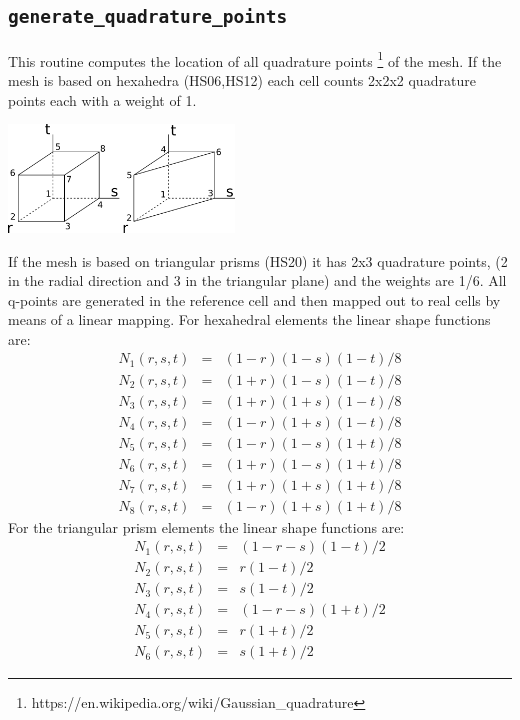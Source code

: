  \subsection{\tt generate\_quadrature\_points}
 This routine computes the location of all quadrature points
 \footnote{https://en.wikipedia.org/wiki/Gaussian\_quadrature} of the mesh. 
 If the mesh is based on hexahedra (HS06,HS12) each cell counts 2x2x2 quadrature points
 each with a weight of 1.
 \begin{center}
 \includegraphics[width=6cm]{images/elements}
 \end{center}
 If the mesh is based on triangular prisms (HS20) it has 2x3 quadrature points, 
 (2 in the radial direction and 3 in the triangular plane) and the weights are 1/6.
 All q-points are generated in the reference cell and then mapped out to real 
 cells by means of a linear mapping.
 For hexahedral elements the linear shape functions are:
 \begin{eqnarray}
 N_1(r,s,t) &=& (1-r)(1-s)(1-t)/8 \nonumber\\ 
 N_2(r,s,t) &=& (1+r)(1-s)(1-t)/8 \nonumber\\ 
 N_3(r,s,t) &=& (1+r)(1+s)(1-t)/8 \nonumber\\ 
 N_4(r,s,t) &=& (1-r)(1+s)(1-t)/8 \nonumber\\ 
 N_5(r,s,t) &=& (1-r)(1-s)(1+t)/8 \nonumber\\ 
 N_6(r,s,t) &=& (1+r)(1-s)(1+t)/8 \nonumber\\ 
 N_7(r,s,t) &=& (1+r)(1+s)(1+t)/8 \nonumber\\ 
 N_8(r,s,t) &=& (1-r)(1+s)(1+t)/8 \nonumber
 \end{eqnarray}
 For the triangular prism elements the linear shape functions are:
 \begin{eqnarray}
 N_1(r,s,t) &=& (1-r-s)(1-t)/2 \nonumber\\ 
 N_2(r,s,t) &=& r(1-t)/2 \nonumber\\ 
 N_3(r,s,t) &=& s(1-t)/2 \nonumber\\ 
 N_4(r,s,t) &=& (1-r-s)(1+t)/2 \nonumber\\ 
 N_5(r,s,t) &=& r(1+t)/2 \nonumber\\ 
 N_6(r,s,t) &=& s(1+t)/2 \nonumber
 \end{eqnarray}
